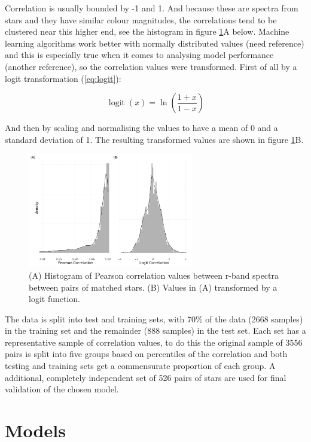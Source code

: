 \documentclass[preprint, 3p,
authoryear]{elsarticle} %
\begin{document}
Correlation is usually bounded by -1 and 1. And because these are
spectra from stars and they have similar colour magnitudes, the
correlations tend to be clustered near this higher end, see the
histogram in figure \ref{fig:histograms}A below. Machine learning
algorithms work better with normally distributed values (need reference)
and this is especially true when it comes to analysing model performance
(another reference), so the correlation values were transformed. First
of all by a logit transformation (\ref{eq:logit}):

\begin{equation}
  \displaystyle \operatorname {logit} (x)=\ln \left({\frac {1+x}{1-x}}\right)
  \label{eq:logit}
\end{equation}

And then by scaling and normalising the values to have a mean of 0 and a
standard deviation of 1. The resulting transformed values are shown in
figure \ref{fig:histograms}B.

\begin{figure}
  \includegraphics[width=\columnwidth, height = 5cm]{figures/histograms}
    \caption{(A) Histogram of Pearson correlation values between r-band spectra between pairs of matched stars. (B) Values in (A) transformed by a logit function.}
    \label{fig:histograms}
\end{figure}

The data is split into test and training sets, with 70\% of the data
(2668 samples) in the training set and the remainder (888 samples) in
the test set. Each set has a representative sample of correlation
values, to do this the original sample of 3556 pairs is split into five
groups based on percentiles of the correlation and both testing and
training sets get a commensurate proportion of each group. A additional,
completely independent set of 526 pairs of stars are used for final
validation of the chosen model.

\hypertarget{models}{%
\section{Models}\label{models}}
\end{document}
